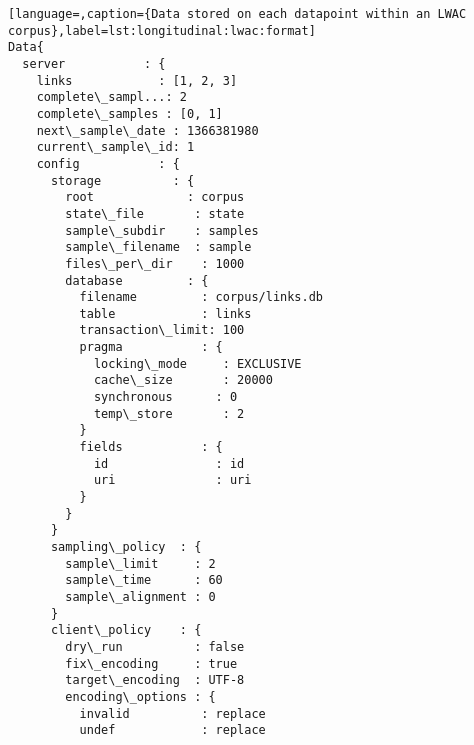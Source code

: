 \begin{lstlisting}[language=,caption={Data stored on each datapoint within an LWAC corpus},label=lst:longitudinal:lwac:format]
Data{
  server           : {
    links            : [1, 2, 3]                                         
    complete\_sampl...: 2                                                 
    complete\_samples : [0, 1]                                            
    next\_sample\_date : 1366381980                                        
    current\_sample\_id: 1                                                 
    config           : {
      storage          : {
        root             : corpus                                            
        state\_file       : state                                             
        sample\_subdir    : samples                                           
        sample\_filename  : sample                                            
        files\_per\_dir    : 1000                                              
        database         : {
          filename         : corpus/links.db                                   
          table            : links                                             
          transaction\_limit: 100                                               
          pragma           : {
            locking\_mode     : EXCLUSIVE                                         
            cache\_size       : 20000                                             
            synchronous      : 0                                                 
            temp\_store       : 2                                                 
          }
          fields           : {
            id               : id                                                
            uri              : uri                                               
          }
        }
      }
      sampling\_policy  : {
        sample\_limit     : 2                                                 
        sample\_time      : 60                                                
        sample\_alignment : 0                                                 
      }
      client\_policy    : {
        dry\_run          : false                                             
        fix\_encoding     : true                                              
        target\_encoding  : UTF-8                                             
        encoding\_options : {
          invalid          : replace                                           
          undef            : replace                                           

\end{lstlisting}
